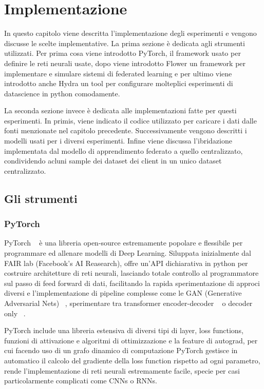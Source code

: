 \chapter{Implementazione}
In questo capitolo viene descritta l'implementazione degli esperimenti
e vengono discusse le scelte implementative.
La prima sezione è dedicata agli strumenti utilizzati. Per prima cosa
viene introdotto PyTorch, il framework usato per 
definire le reti neurali usate, dopo viene introdotto Flower un 
framework per implementare e simulare sistemi di federated learning e 
per ultimo viene introdotto anche Hydra un tool per configurare 
molteplici esperimenti di datascience in python comodamente.

La seconda sezione invece è dedicata alle implementazioni fatte per 
questi esperimenti. In primis, viene indicato il codice utilizzato per 
caricare i dati dalle fonti menzionate nel capitolo precedente.
Successivamente vengono descritti i modelli usati per
i diversi esperimenti. Infine viene discussa l'ibridazione 
implementata dal modello di 
apprendimento federato a quello centralizzato, condividendo acluni 
sample dei dataset dei client in un unico dataset centralizzato.


\section{Gli strumenti}
\subsection{PyTorch}
PyTorch ~\cite{pytorch} è una libreria open-source estremamente popolare e flessibile 
per programmare ed allenare modelli di Deep Learning.
Siluppata inizialmente dal FAIR lab (Facebook's AI Reasearch), offre
un'API dichiarativa in python per costruire architetture di reti 
neurali, lasciando totale controllo al programmatore sul passo di 
feed forward di dati, facilitando la rapida sperimentazione di 
approci diversi e l'implementazione di pipeline
complesse come le GAN (Generative Adversarial Nets) ~\cite{goodfellow2014gan},
sperimentare tra transformer encoder-decoder ~\cite{vaswani2017trans}
o decoder only ~\cite{Radford2018ImprovingLU}.

PyTorch include una libreria estensiva di diversi tipi di layer,
loss functions, funzioni di attivazione e algoritmi di ottimizzazione
e la feature di autograd,
per cui facendo uso di un grafo dinamico di computazione PyTorch 
gestisce in automatico il calcolo del gradiente della loss function 
rispetto ad ogni parametro, rende l'implementazione di reti neurali 
estremamente facile, specie per casi particolarmente complicati 
come CNNs o RNNs.

